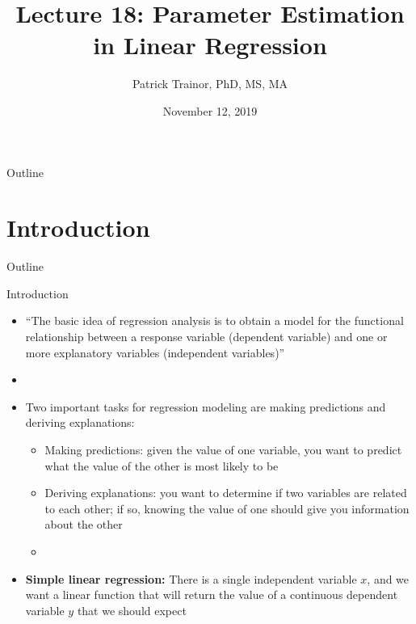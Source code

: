 \documentclass[xcolor=dvipsnames]{beamer}
\title[Lecture 18]{Lecture 18: Parameter Estimation in Linear Regression}
\author[Patrick Trainor]{Patrick Trainor, PhD, MS, MA}
\institute[NMSU]{New Mexico State University}
\date{November 12, 2019}
\begin{document}
\begin{frame}
\maketitle
\end{frame}

\begin{frame}{Outline}
\tableofcontents[hideallsubsections]
\end{frame}

\section{Introduction}
\begin{frame}{Outline}
\tableofcontents[currentsection,subsectionstyle=show/shaded/hide]
\end{frame}

\begin{frame}{Introduction}
	\begin{itemize}
		\item ``The basic idea of regression analysis is to obtain a model for the functional relationship between a response variable (dependent variable) and one or more explanatory variables (independent variables)'' \pause
		\item[]
		\item Two important tasks for regression modeling are making predictions and deriving explanations: \pause
		\begin{itemize}
			\item Making predictions: given the value of one variable, you want to predict what the value of the other is most likely to be \pause
			\item Deriving explanations: you want to determine if two variables are related to each other; if so, knowing the value of one should give you information about the other \pause
			\item[]
		\end{itemize}
		\item \textbf{Simple linear regression:} There is a single independent variable $x$, and we want a linear function that will return the value of a continuous dependent variable $y$ that we should expect
	\end{itemize}
\end{frame}
\end{document}
